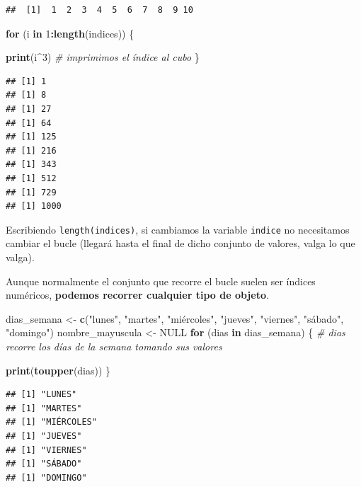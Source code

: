 \documentclass[11pt,]{book}
\newenvironment{Shaded}{\begin{snugshade}}{\end{snugshade}}
\newcommand{\CommentTok}[1]{\textcolor[rgb]{0.37,0.37,0.37}{\textit{#1}}}
\newcommand{\ControlFlowTok}[1]{\textcolor[rgb]{0.27,0.27,0.27}{\textbf{#1}}}
\newcommand{\DecValTok}[1]{\textcolor[rgb]{0.06,0.06,0.06}{#1}}
\newcommand{\KeywordTok}[1]{\textcolor[rgb]{0.27,0.27,0.27}{\textbf{#1}}}
\newcommand{\NormalTok}[1]{#1}
\newcommand{\OperatorTok}[1]{\textcolor[rgb]{0.43,0.43,0.43}{\textbf{#1}}}
\newcommand{\OtherTok}[1]{\textcolor[rgb]{0.37,0.37,0.37}{#1}}
\newcommand{\StringTok}[1]{\textcolor[rgb]{0.5,0.5,0.5}{#1}}
\begin{document}
\begin{verbatim}
##  [1]  1  2  3  4  5  6  7  8  9 10
\end{verbatim}

\begin{Shaded}
\begin{Highlighting}[]
\ControlFlowTok{for}\NormalTok{ (i }\ControlFlowTok{in} \DecValTok{1}\OperatorTok{:}\KeywordTok{length}\NormalTok{(indices)) \{ }
  
  \KeywordTok{print}\NormalTok{(i}\OperatorTok{^}\DecValTok{3}\NormalTok{) }\CommentTok{# imprimimos el índice al cubo}
\NormalTok{\}}
\end{Highlighting}
\end{Shaded}

\begin{verbatim}
## [1] 1
## [1] 8
## [1] 27
## [1] 64
## [1] 125
## [1] 216
## [1] 343
## [1] 512
## [1] 729
## [1] 1000
\end{verbatim}

Escribiendo \texttt{length(indices)}, si cambiamos la variable \texttt{indice} no necesitamos cambiar el bucle (llegará hasta el final de dicho conjunto de valores, valga lo que valga).

Aunque normalmente el conjunto que recorre el bucle suelen ser índices numéricos, \textbf{podemos recorrer cualquier tipo de objeto}.

\begin{Shaded}
\begin{Highlighting}[]
\NormalTok{dias_semana <-}\StringTok{ }\KeywordTok{c}\NormalTok{(}\StringTok{"lunes"}\NormalTok{, }\StringTok{"martes"}\NormalTok{, }\StringTok{"miércoles"}\NormalTok{, }\StringTok{"jueves"}\NormalTok{,}
                 \StringTok{"viernes"}\NormalTok{, }\StringTok{"sábado"}\NormalTok{, }\StringTok{"domingo"}\NormalTok{)}
\NormalTok{nombre_mayuscula <-}\StringTok{ }\OtherTok{NULL}
\ControlFlowTok{for}\NormalTok{ (dias }\ControlFlowTok{in}\NormalTok{ dias_semana) \{ }\CommentTok{# dias recorre los días de la semana tomando sus valores}
  
  \KeywordTok{print}\NormalTok{(}\KeywordTok{toupper}\NormalTok{(dias))}
\NormalTok{\}}
\end{Highlighting}
\end{Shaded}

\begin{verbatim}
## [1] "LUNES"
## [1] "MARTES"
## [1] "MIÉRCOLES"
## [1] "JUEVES"
## [1] "VIERNES"
## [1] "SÁBADO"
## [1] "DOMINGO"
\end{verbatim}
\end{document}
